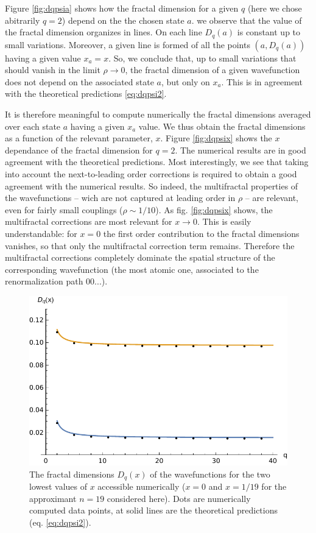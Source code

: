 \documentclass[11pt]{article}
\begin{document}
Figure \eqref{fig:dqpsia} shows how the fractal dimension for a given $q$ (here we chose abitrarily $q=2$) depend on the the chosen state $a$.
we observe that the value of the fractal dimension organizes in lines. On each line $D_q(a)$ is constant up to small variations. Moreover, a given line is formed of all the points $(a, D_q(a))$ having a given value $x_a = x$. 
So, we conclude that, up to small variations that should vanish in the limit $\rho \rightarrow 0$, the fractal dimension of a given wavefunction does not depend on the associated state $a$, but only on $x_a$. This is in agreement with the theoretical predictions \eqref{eq:dqpsi2}.

It is therefore meaningful to compute numerically the fractal dimensions averaged over each state $a$ having a given $x_a$ value. We thus obtain the fractal dimensions as a function of the relevant parameter, $x$.
Figure \eqref{fig:dqpsix} shows the $x$ dependance of the fractal dimension for $q=2$. 
The numerical results are in good agreement with the theoretical predictions.
Most interestingly, we see that taking into account the next-to-leading order corrections is required to obtain a good agreement with the numerical results.
So indeed, the multifractal properties of the wavefunctions -- wich are not captured at leading order in $\rho$ -- are relevant, even for fairly small couplings ($\rho \sim 1/10$).
As fig. \eqref{fig:dqpsix} shows, the multifractal corrections are most relevant for $x \rightarrow 0$.
This is easily understandable: for $x=0$ the first order contribution to the fractal dimensions vanishes, so that only the multifractal correction term remains. 
Therefore the multifractal corrections completely dominate the spatial structure of the corresponding wavefunction (the most atomic one, associated to the renormalization path $00...$).

\begin{figure}[htp]
  \centering
  \includegraphics[width=.5\textwidth]{img/local_wf_q.pdf}
  \caption{The fractal dimensions $D_q(x)$ of the wavefunctions for the two lowest values of $x$ accessible numerically ($x = 0$ and $x = 1/19$ for the approximant $n=19$ considered here). Dots are numerically computed data points, at solid lines are the theoretical predictions (eq. \eqref{eq:dqpsi2}).}
\label{fig:dqpsiq}
\end{figure}
\end{document}
